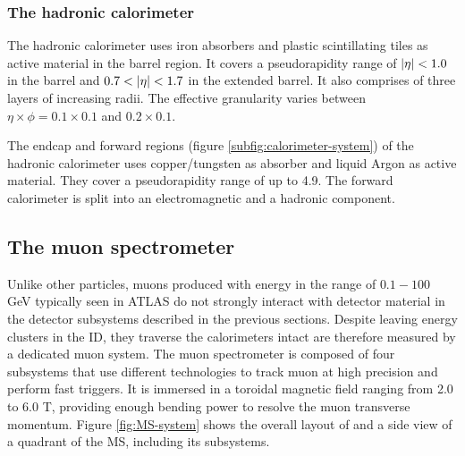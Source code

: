 \subsubsection{The hadronic calorimeter}
The hadronic calorimeter uses iron absorbers and plastic scintillating tiles as active material in the barrel region. It covers a pseudorapidity range of $\abs{\eta} < 1.0$ in the barrel and $0.7 < \abs{\eta} < 1.7$ in the extended barrel. It also comprises of three layers of increasing radii. The effective granularity varies between $\eta\times\phi=0.1\times 0.1$ and $0.2\times 0.1$. 

The endcap and forward regions (figure \ref{subfig:calorimeter-system}) of the hadronic calorimeter uses copper/tungsten as absorber and liquid Argon as active material. They cover a pseudorapidity range of up to 4.9. The forward calorimeter is split into an electromagnetic and a hadronic component. 

\subsection{The muon spectrometer}
Unlike other particles, muons produced with energy in the range of $0.1-100$ GeV typically seen in ATLAS do not strongly interact with detector material in the detector subsystems described in the previous sections. Despite leaving energy clusters in the ID, they traverse the calorimeters intact are therefore measured by a dedicated muon system. The muon spectrometer is composed of four subsystems that use different technologies to 
track muon at high precision and perform fast triggers. It is immersed in a toroidal magnetic field ranging from 2.0 to 6.0 T, providing enough bending power to resolve the muon transverse momentum. Figure \ref{fig:MS-system} shows the overall layout of and a side view of a quadrant of the MS, including its subsystems. 

